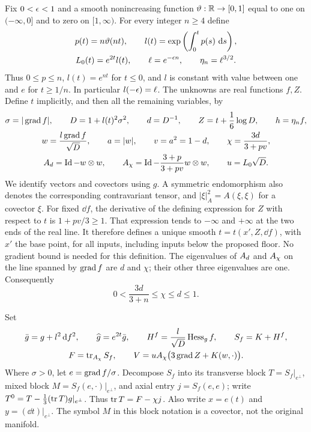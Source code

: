 Fix $0<\epsilon<1$ and a smooth nonincreasing function
$\vartheta:\mathbb R\to[0,1]$ equal to one on $(-\infty,0]$ and to zero on
$[1,\infty)$.  For every integer $n\ge4$ define
\begin{equation}\label{four:sys:parameters}
\begin{gathered}
 p(t)=n\vartheta(nt),\qquad
 l(t)=\exp\left(\int_0^t p(s)\,\,\mathrm d s\right),\\
 L_0(t)=e^{2t}l(t),\qquad
 \ell=e^{-\epsilon n},\qquad \eta_n=\ell^{3/2}.
\end{gathered}
\end{equation}
Thus $0\le p\le n$, $l(t)=e^{nt}$ for $t\le0$, and $l$ is constant
with value between one and $e$ for $t\ge1/n$.  In particular
$l(-\epsilon)=\ell$.  The unknowns are real functions $f,Z$.  Define $t$
implicitly, and then all the remaining variables, by
\begin{equation}\label{four:sys:variables}
\begin{gathered}
 \sigma=|\operatorname{grad} f|,\qquad
 D=1+l(t)^2\sigma^2,\qquad d=D^{-1},\qquad
 Z=t+\frac16\log D,\qquad h=\eta_n f,\\
 w=\frac{l\operatorname{grad} f}{\sqrt D},\qquad a=|w|,\qquad
 v=a^2=1-d,\qquad \chi=\frac{3d}{3+pv},\\
 A_d=\operatorname{Id}-w\otimes w,\qquad
 A_\chi=\operatorname{Id}-\frac{3+p}{3+pv}w\otimes w,\qquad
 u=L_0\sqrt D.
\end{gathered}
\end{equation}
We identify vectors and covectors using $g$.  A symmetric endomorphism
also denotes the corresponding contravariant tensor, and
$|\xi|_A^2=A(\xi,\xi)$ for a covector $\xi$.
For fixed $\dd f$, the derivative of the defining expression for $Z$
with respect to $t$ is $1+pv/3\ge1$.  That expression tends to
$-\infty$ and $+\infty$ at the two ends of the real line.  It therefore
defines a unique smooth $t=t(x',Z,\dd f)$, with $x'$ the base point, for all inputs, including inputs
below the proposed floor.  No gradient bound is needed for this definition.
The eigenvalues of $A_d$ and $A_\chi$ on the line spanned by $\operatorname{grad} f$
are $d$ and $\chi$; their other three eigenvalues are one.  Consequently
\begin{equation}\label{four:sys:eigenvalues}
 0<\frac{3d}{3+n}\le\chi\le d\le1.
\end{equation}

Set
\begin{equation}\label{four:sys:metric-and-trace}
\begin{gathered}
 \bar g=g+l^2\,\mathrm d f^2,\qquad \widehat g=e^{2t}\bar g,\qquad
 H^f=\frac{l}{\sqrt D}\operatorname{Hess}_g f,\qquad S_f=K+H^f,\\
 F=\operatorname{tr}_{A_\chi}S_f,\qquad
 V=uA_\chi\bigl(3\operatorname{grad} Z+K(w,\cdot)\bigr).
\end{gathered}
\end{equation}
Where $\sigma>0$, let $e=\operatorname{grad} f/\sigma$.  Decompose $S_f$ into its
transverse block $T=S_f|_{e^\perp}$, mixed block
$M=S_f(e,\cdot)|_{e^\perp}$, and axial entry $j=S_f(e,e)$; write
$T^0=T-\frac13(\operatorname{tr} T)g|_{e^\perp}$.  Thus $\operatorname{tr} T=F-\chi j$.
Also write $x=e(t)$ and $y=(\dd t)|_{e^\perp}$.  The symbol $M$ in this
block notation is a covector, not the original manifold.


